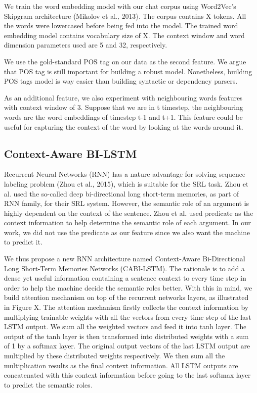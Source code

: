 We train the word embedding model with our chat corpus using Word2Vec’s Skipgram architecture (Mikolov et al., 2013). The corpus contains X tokens. All the words were lowercased before being fed into the model. The trained word embedding model contains vocabulary size of X. The context window and word dimension parameters used are 5 and 32, respectively.

We use the gold-standard POS tag on our data as the second feature. We argue that POS tag is still important for building a robust model. Nonetheless, building POS tags model is way easier than building syntactic or dependency parsers.

As an additional feature, we also experiment with neighbouring words features with context window of 3. Suppose that we are in t timestep, the neighbouring words are the word embeddings of timestep t-1 and t+1. This feature could be useful for capturing the context of the word by looking at the words around it.

\subsection{Context-Aware BI-LSTM}
Recurrent Neural Networks (RNN) has a nature advantage for solving sequence labeling problem (Zhou et al., 2015), which is suitable for the SRL task. Zhou et al. used the so-called deep bi-directional long short-term memories, as part of RNN family, for their SRL system. However, the semantic role of an argument is highly dependent on the context of the sentence. Zhou et al. used predicate as the context information to help determine the semantic role of each argument. In our work, we did not use the predicate as our feature since we also want the machine to predict it.

We thus propose a new RNN architecture named Context-Aware Bi-Directional Long Short-Term Memories Networks (CABI-LSTM). The rationale is to add a dense yet useful information containing a sentence context to every time step in order to help the machine decide the semantic roles better. With this in mind, we build attention mechanism on top of the recurrent networks layers, as illustrated in Figure X. The attention mechanism firstly collects the context information by multiplying trainable weights with all the vectors from every time step of the last LSTM output. We sum all the weighted vectors and feed it into tanh layer. The output of the tanh layer is then transformed into distributed weights with a sum of 1 by a softmax layer. The original output vectors of the last LSTM output are multiplied by these distributed weights respectively. We then sum all the multiplication results as the final context information. All LSTM outputs are concatenated with this context information before going to the last softmax layer to predict the semantic roles.


